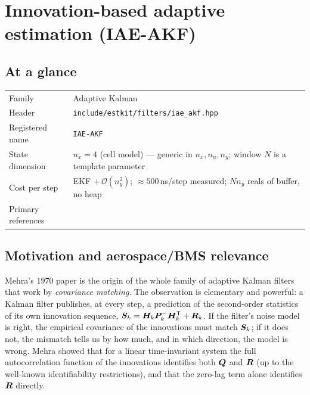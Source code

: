 \chapter{Innovation-based adaptive estimation (IAE-AKF)}
\label{ch:iaeakf}

\section*{At a glance}
\begin{tabular}{@{}l>{\raggedright\arraybackslash}p{}@{}}
Family & Adaptive Kalman \\
Header & \texttt{include/estkit/filters/iae\_akf.hpp} \\
Registered name & \texttt{IAE-AKF} \\
State dimension & $n_x = 4$ (cell model) --- generic in $n_x, n_u, n_y$; window $N$ is a template parameter \\
Cost per step & EKF $+\,\mathcal{O}(n_y^2)$; $\approx 500$\,ns/step measured; $N n_y$ reals of buffer, no heap \\
Primary references & \cite{mehra1970,mohamed1999adaptive,maybeck1979,jazwinski1970} \\
\end{tabular}

\section{Motivation and aerospace/BMS relevance}
Mehra's 1970 paper \cite{mehra1970} is the origin of the whole family of adaptive Kalman filters
that work by \emph{covariance matching}.  The observation is elementary and powerful: a Kalman
filter publishes, at every step, a prediction of the second-order statistics of its own innovation
sequence, $\bm{S}_k = \bm{H}_k\bm{P}^{-}_k\bm{H}_k^{\mathsf{T}} + \bm{R}_k$.  If the filter's noise model is right, the
empirical covariance of the innovations must match $\bm{S}_k$; if it does not, the mismatch tells us
by how much, and in which direction, the model is wrong.  Mehra showed that for a linear
time-invariant system the full autocorrelation function of the innovations identifies both $\bm{Q}$
and $\bm{R}$ (up to the well-known identifiability restrictions), and that the zero-lag term alone
identifies $\bm{R}$ directly.

